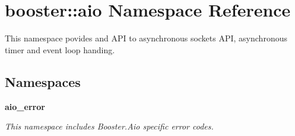 \section{booster\+:\+:aio Namespace Reference}
\label{namespacebooster_1_1aio}


This namespace povides and A\+PI to asynchronous sockets A\+PI, asynchronous timer and event loop handing.  


\subsection*{Namespaces}
\begin{DoxyCompactItemize}
\item 
 {\bf aio\+\_\+error}
\begin{DoxyCompactList}\small\item\em This namespace includes Booster.\+Aio specific error codes. \end{DoxyCompactList}\end{DoxyCompactItemize}
